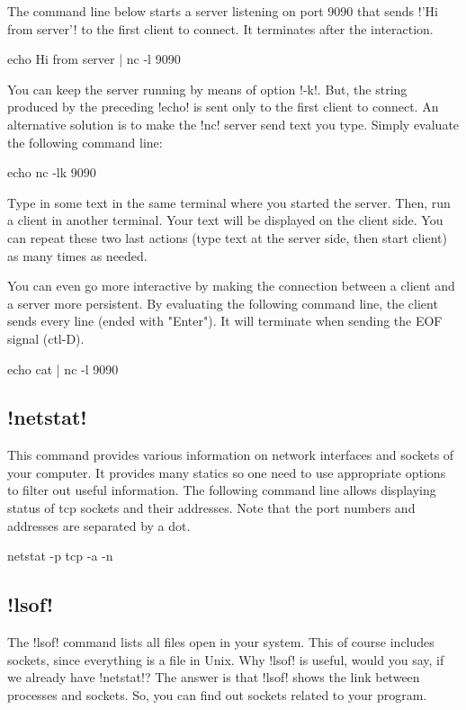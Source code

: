 \documentclass[a4paper,10pt,twoside]{book}
\begin{document}
The command line below starts a server listening on port 9090 that sends \ct!'Hi from server'! to the first client to connect.
It terminates after the interaction.
\begin{code}{}
echo Hi from server | nc -l 9090 
\end{code}

You can keep the server running by means of option \ct!-k!.
But, the string produced by the preceding \ct!echo! is sent only to the first client to connect.
An alternative solution is to make the \ct!nc! server send text  you type.
Simply evaluate the following command line:
\begin{code}{}
echo nc -lk 9090 
\end{code}

Type in some text in the same terminal where you started the server.
Then, run a client in another terminal.
Your text will be displayed on the client side.
You can repeat these two last actions (type text at the server side, then start client) as many times as needed.

You can even go more interactive by making the connection between a client and a server more persistent.
By evaluating the following command line, the client sends every line (ended with "Enter").
It will terminate when sending the EOF signal (ctl-D).
\begin{code}{}
echo cat | nc -l 9090 
\end{code}


\subsection{\ct!netstat!}
This command provides various information on network interfaces and sockets of your computer.
It provides many statics so one need to use appropriate options to filter out useful information.
The following command line allows displaying status of tcp sockets and their addresses.
Note that the port numbers and addresses are separated by a dot.
\begin{code}{}
netstat -p tcp -a -n
\end{code}
 
\subsection{\ct!lsof!}
The \ct!lsof! command lists all files open in your system.
This of course includes sockets, since everything is a file in Unix.
Why \ct!lsof! is useful, would you say, if we already have \ct!netstat!?
The answer is that \ct!lsof! shows the link between processes and sockets.
So, you can find out sockets related to your program.
\end{document}
